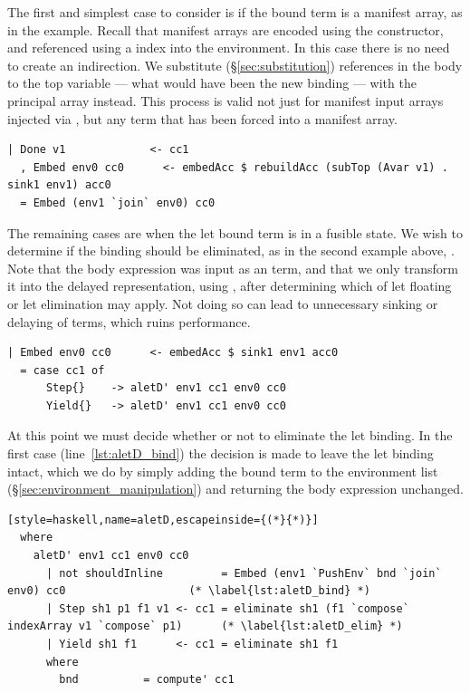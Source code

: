 The first and simplest case to consider is if the bound term is a manifest
array, as in the  example. Recall that manifest arrays are encoded
using the  constructor, and referenced using a 
index into the environment. In this case there is no need to create an
indirection. We substitute (\S\ref{sec:substitution}) references in the body to
the top variable  --- what would have been the new binding ---
with the principal array  instead. This process is valid not just for
manifest input arrays injected via , but any term that has been forced
into a manifest array.
%
\begin{lstlisting}[style=haskell,name=aletD]
  | Done v1             <- cc1
  , Embed env0 cc0      <- embedAcc $ rebuildAcc (subTop (Avar v1) . sink1 env1) acc0
  = Embed (env1 `join` env0) cc0
\end{lstlisting}

The remaining cases are when the let bound term  is in a fusible
state. We wish to determine if the binding should be eliminated, as in the
second example above, . Note that the body expression was input
as an  term, and that we only transform it into the delayed
representation, using , after determining which of let floating
or let elimination may apply. Not doing so can lead to unnecessary sinking or
delaying of terms, which ruins performance.
%
\begin{lstlisting}[style=haskell,name=aletD]
  | Embed env0 cc0      <- embedAcc $ sink1 env1 acc0
  = case cc1 of
      Step{}    -> aletD' env1 cc1 env0 cc0
      Yield{}   -> aletD' env1 cc1 env0 cc0
\end{lstlisting}

At this point we must decide whether or not to eliminate the let binding. In the
first case (line~\ref{lst:aletD_bind}) the decision is made to leave the let
binding intact, which we do by simply adding the bound term to the environment
list (\S\ref{sec:environment_manipulation}) and returning the body expression
unchanged.
%
\begin{lstlisting}[style=haskell,name=aletD,escapeinside={(*}{*)}]
  where
    aletD' env1 cc1 env0 cc0
      | not shouldInline         = Embed (env1 `PushEnv` bnd `join` env0) cc0                   (* \label{lst:aletD_bind} *)
      | Step sh1 p1 f1 v1 <- cc1 = eliminate sh1 (f1 `compose` indexArray v1 `compose` p1)      (* \label{lst:aletD_elim} *)
      | Yield sh1 f1      <- cc1 = eliminate sh1 f1
      where
        bnd          = compute' cc1
\end{lstlisting}

